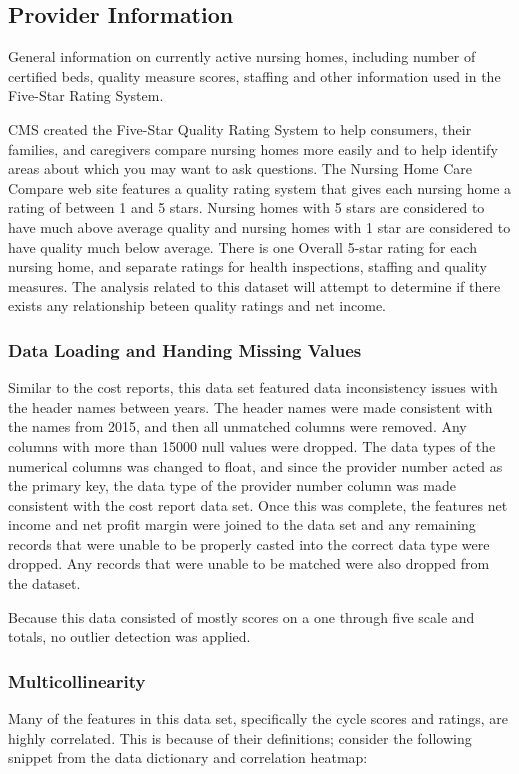 \documentclass{article}
\theoremstyle{mytheoremstyle}
\theoremstyle{mytheoremstyle}
\theoremstyle{myproblemstyle}
\begin{document}
\subsection{Provider Information}
General information on currently active nursing homes, including number of certified beds, quality measure scores, staffing and other information used in the Five-Star Rating System.

CMS created the Five-Star Quality Rating System to help consumers, their families, and caregivers compare nursing homes more easily and to help identify areas about which you may want to ask questions.  The Nursing Home Care Compare web site features a quality rating system that gives each nursing home a rating of between 1 and 5 stars.  Nursing homes with 5 stars are considered to have much above average quality and nursing homes with 1 star are considered to have quality much below average.  There is one Overall 5-star rating for each nursing home, and separate ratings for health inspections, staffing and quality measures. The analysis related to this dataset will attempt to determine if there exists any relationship beteen quality ratings and net income. 

\subsubsection{Data Loading and Handing Missing Values}
Similar to the cost reports, this data set featured data inconsistency issues with the header names between years. The header names were made consistent with the names from 2015, and then all unmatched columns were removed. Any columns with more than 15000 null values were dropped. The data types of the numerical columns was changed to float, and since the provider number acted as the primary key, the data type of the provider number column was made consistent with the cost report data set. Once this was complete, the features net income and net profit margin were joined to the data set and any remaining records that were unable to be properly casted into the correct data type were dropped. Any records that were unable to be matched were also dropped from the dataset.

Because this data consisted of mostly scores on a one through five scale and totals, no outlier detection was applied. 

\subsubsection{Multicollinearity}
Many of the features in this data set, specifically the cycle scores and ratings, are highly correlated. This is because of their definitions; consider the following snippet from the data dictionary and correlation heatmap:
\end{document}
